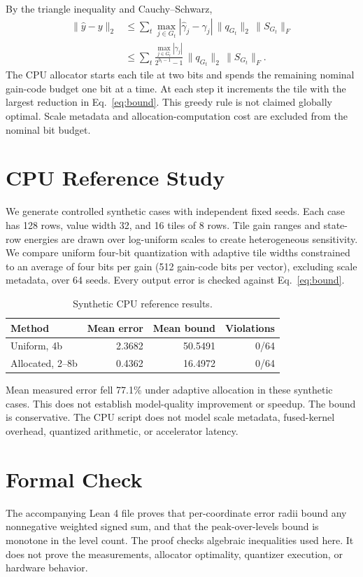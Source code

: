 \documentclass[11pt]{article}
\begin{document}
By the triangle inequality and Cauchy--Schwarz,
\begin{align}
\|\hat y-y\|_2 &\le \sum_t \max_{j\in G_t}|\hat\gamma_j-\gamma_j|\,\|q_{G_t}\|_2\,\|S_{G_t}\|_F \\
&\le \sum_t \frac{\max_{j\in G_t}|\gamma_j|}{2^{b_t-1}-1}\,\|q_{G_t}\|_2\,\|S_{G_t}\|_F. \label{eq:bound}
\end{align}
The CPU allocator starts each tile at two bits and spends the remaining nominal gain-code budget one bit at a time. At each step it increments the tile with the largest reduction in Eq.~\ref{eq:bound}. This greedy rule is not claimed globally optimal. Scale metadata and allocation-computation cost are excluded from the nominal bit budget.
\section{CPU Reference Study}
We generate controlled synthetic cases with independent fixed seeds. Each case has 128 rows, value width 32, and 16 tiles of 8 rows. Tile gain ranges and state-row energies are drawn over log-uniform scales to create heterogeneous sensitivity. We compare uniform four-bit quantization with adaptive tile widths constrained to an average of four bits per gain (512 gain-code bits per vector), excluding scale metadata, over 64 seeds. Every output error is checked against Eq.~\ref{eq:bound}.
\begin{table}[t]
\centering
\small
\setlength{\tabcolsep}{3pt}
\begin{tabular}{lrrr}
\toprule
Method & Mean error & Mean bound & Violations \\
\midrule
Uniform, 4b & 2.3682 & 50.5491 & 0/64 \\
Allocated, 2--8b & 0.4362 & 16.4972 & 0/64 \\
\bottomrule
\end{tabular}
\caption{Synthetic CPU reference results.}
\end{table}
Mean measured error fell 77.1\% under adaptive allocation in these synthetic cases. This does not establish model-quality improvement or speedup. The bound is conservative. The CPU script does not model scale metadata, fused-kernel overhead, quantized arithmetic, or accelerator latency.
\section{Formal Check}
The accompanying Lean 4 file proves that per-coordinate error radii bound any nonnegative weighted signed sum, and that the peak-over-levels bound is monotone in the level count. The proof checks algebraic inequalities used here. It does not prove the measurements, allocator optimality, quantizer execution, or hardware behavior.
\end{document}
